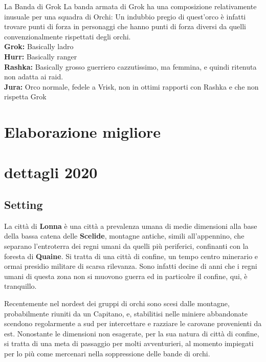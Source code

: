 \documentclass[10pt,twoside, twocolumn, openany]{dndbook}
\begin{document}
\begin{DndSidebar}{La Banda di Grok}
 La banda armata di Grok ha una composizione relativamente inusuale per una squadra di Orchi: Un indubbio pregio di quest'orco è infatti trovare punti di forza in personaggi che hanno punti di forza diversi da quelli convenzionalmente rispettati degli orchi. \\
 \textbf{Grok:} Basically ladro \\
 \textbf{Hurr:} Basically ranger \\
 \textbf{Rashka:} Basically grosso guerriero cazzutissimo, ma femmina, e quindi ritenuta non adatta ai raid.  \\
 \textbf{Jura:} Orco normale, fedele a Vrisk, non in ottimi rapporti con Rashka e che non rispetta Grok
\end{DndSidebar}


\clearpage

\section{Elaborazione migliore}



\clearpage

\section{dettagli 2020}

\subsection{Setting}
La città di \textbf{Lonna} è una città a prevalenza umana di medie dimensioni alla base della bassa catena delle \textbf{Scelide}, montagne antiche, simili all'appennino, che separano l'entroterra dei regni umani da quelli più periferici, confinanti con la foresta di \textbf{Quaine}.
Si tratta di una città di confine, un tempo centro minerario e ormai presidio militare di scarsa rilevanza. Sono infatti decine di anni che i regni umani di questa zona non si muovono guerra ed in particolre il confine, qui, è tranquillo.

Recentemente nel nordest dei gruppi di orchi sono scesi dalle montagne, probabilmente riuniti da un Capitano, e, stabilitisi nelle miniere abbandonate scendono regolarmente a sud per intercettare e razziare le carovane provenienti da est.
Nonostante le dimensioni non esagerate, per la sua natura di città di confine, si tratta di una meta di passaggio per molti avventurieri, al momento impiegati per lo più come mercenari nella soppressione delle bande di orchi.
\end{document}
